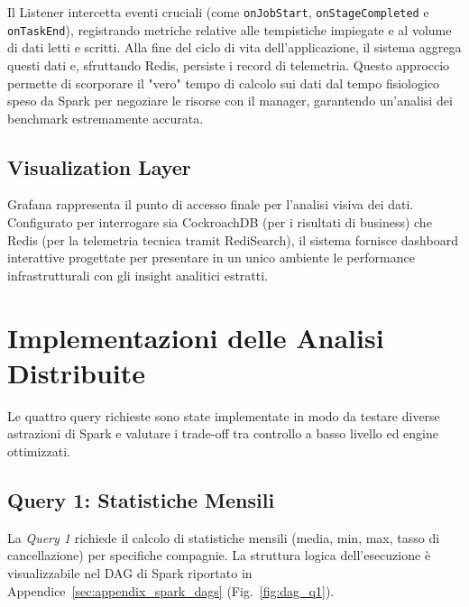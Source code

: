 \documentclass[conference]{IEEEtran}
\begin{document}
Il Listener intercetta eventi cruciali (come \texttt{onJobStart}, \texttt{onStageCompleted} e \texttt{onTaskEnd}), registrando metriche relative alle tempistiche impiegate e al volume di dati letti e scritti.
Alla fine del ciclo di vita dell'applicazione, il sistema aggrega questi dati e, sfruttando Redis, persiste i record di telemetria.
Questo approccio permette di scorporare il "vero" tempo di calcolo sui dati dal tempo fisiologico speso da Spark per negoziare le risorse con il manager, garantendo un'analisi dei benchmark estremamente accurata.

\subsection{Visualization Layer}\label{subsec:visualization_layer}
Grafana rappresenta il punto di accesso finale per l'analisi visiva dei dati. 
Configurato per interrogare sia CockroachDB (per i risultati di business) che Redis (per la telemetria tecnica tramit RediSearch), il sistema fornisce dashboard interattive progettate per presentare in un unico ambiente le performance infrastrutturali con gli insight analitici estratti.




\section{Implementazioni delle Analisi Distribuite}\label{sec:implementation_details}
Le quattro query richieste sono state implementate in modo da testare diverse astrazioni di Spark e valutare i trade-off tra controllo a basso livello ed engine ottimizzati.

\subsection{Query 1: Statistiche Mensili}
La \textit{Query 1} richiede il calcolo di statistiche mensili (media, min, max, tasso di cancellazione) per specifiche compagnie.
La struttura logica dell'esecuzione è visualizzabile nel DAG di Spark riportato in Appendice~\ref{sec:appendix_spark_dags} (Fig.~\ref{fig:dag_q1}).
\end{document}
